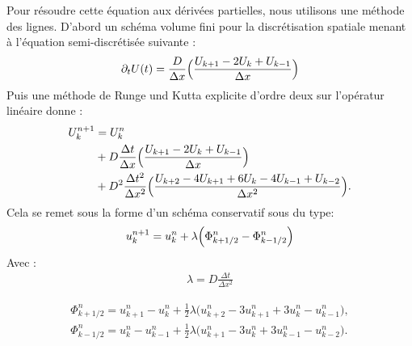 Pour résoudre cette équation aux dérivées partielles, nous utilisons une méthode des lignes. 
D'abord un schéma volume fini pour la discrétisation spatiale menant à l'équation semi-discrétisée suivante : 
\begin{align}
    \partial_t U(t) = \frac{D}{\Delta x} \Bigl(\frac{U_{k+1} - 2 U_{k} + U_{k-1}}{\Delta x}\Bigr)
\end{align}
Puis une méthode de Runge und Kutta explicite d'ordre deux sur l'opératur linéaire donne :
\begin{align}
    U_k^{n+1} &= U_k^n\\ \notag
    &+ D \frac{\Delta t}{\Delta x} \Bigl(\frac{U_{k+1} - 2 U_{k} + U_{k-1}}{\Delta x}\Bigr)\\ \notag
    &+ D^2 \frac{\Delta t^2}{\Delta x^2} \Bigl(\frac{U_{k+2} -4 U_{k+1}  +6 U_{k} -4 U_{k-1} + U_{k-2}}{\Delta x^2}\Bigr).
\end{align}
Cela se remet sous la forme d'un schéma conservatif sous du type:
\begin{align}
    u^{n+1}_k = u^n_k + \lambda \Bigl( \Phi^n_{k+1/2} - \Phi^n_{k-1/2} \Bigr)
\end{align}
Avec : 
\begin{align}
    \lambda = D \frac{\Delta t}{\Delta x^2}
\end{align}

\begin{align}
    \Phi^n_{k+1/2} = u^n_{k+1} - u^n_{k} + \frac{1}{2} \lambda \bigr( u^n_{k+2} - 3  u^n_{k+1} + 3 u^n_{k} - u^n_{k-1} \bigl),\\
    \Phi^n_{k-1/2} = u^n_{k} - u^n_{k-1} + \frac{1}{2} \lambda \bigr( u^n_{k+1} - 3  u^n_{k} + 3 u^n_{k-1} - u^n_{k-2} \bigl).  
\end{align}

